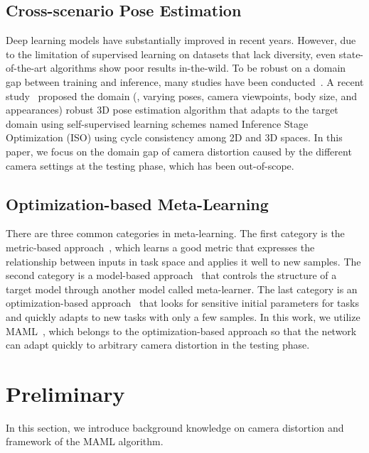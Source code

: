     \subsection{Cross-scenario Pose Estimation}
        \vspace{-1mm}
        Deep learning models have substantially improved in recent years. However, due to the limitation of supervised learning on datasets that lack diversity, even state-of-the-art algorithms show poor results in-the-wild. To be robust on a domain gap between training and inference, many studies have been conducted~\cite{ref21_shocher2018zero,ref22_soh2020meta,ref18_ISO_NeurIPS2020}. A recent study~\cite{ref18_ISO_NeurIPS2020} proposed the domain (\eg, varying poses, camera viewpoints, body size, and appearances) robust 3D pose estimation algorithm that adapts to the target domain using self-supervised learning schemes named Inference Stage Optimization (ISO) using cycle consistency among 2D and 3D spaces. In this paper, we focus on the domain gap of camera distortion caused by the different camera settings at the testing phase, which has been out-of-scope.
    
    \subsection{Optimization-based Meta-Learning}
        \vspace{-1mm}
        There are three common categories in meta-learning. The first category is the metric-based approach~\cite{ref23_Koch2015SiameseNN,ref24_NIPS2016_90e13578,ref25_NIPS2017_cb8da676,ref26_Sung_2018_CVPR}, which learns a good metric that expresses the relationship between inputs in task space and applies it well to new samples. The second category is a model-based approach~\cite{ref27_pmlr-v48-santoro16,ref28_pmlr-v70-munkhdalai17a,ref29_mishra2018a} that controls the structure of a target model through another model called meta-learner. The last category is an optimization-based approach~\cite{ref30_10.5555/3157382.3157543,ref31_Ravi2017OptimizationAA,ref20_pmlr-v70-finn17a,ref32_NEURIPS2019_072b030b} that looks for sensitive initial parameters for tasks and quickly adapts to new tasks with only a few samples. In this work, we utilize MAML~\cite{ref20_pmlr-v70-finn17a}, which belongs to the optimization-based approach so that the network can adapt quickly to arbitrary camera distortion in the testing phase.


\section{Preliminary}
    In this section, we introduce background knowledge on camera distortion and framework of the MAML algorithm.
    \vspace{-7mm}


